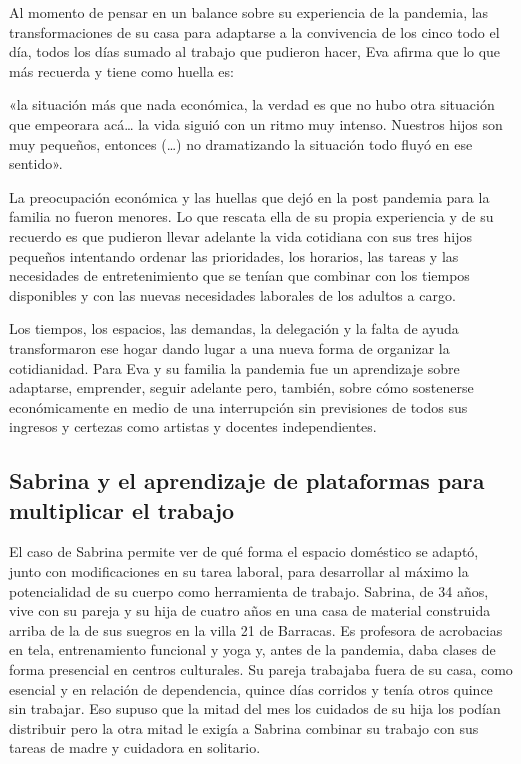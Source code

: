 \begin{refsection}
Al momento de pensar en un balance sobre su experiencia de la pandemia, las transformaciones de su casa para adaptarse a la convivencia de los cinco todo el día, todos los días sumado al trabajo que pudieron hacer, Eva afirma que lo que más recuerda y tiene como huella es:


\begin{gbcita}
«la situación más que nada económica, la verdad es que no hubo otra situación que empeorara acá… la vida siguió con un ritmo muy intenso. Nuestros hijos son muy pequeños, entonces (…) no dramatizando la situación todo fluyó en ese sentido».

\end{gbcita}

La preocupación económica y las huellas que dejó en la post pandemia para la familia no fueron menores. Lo que rescata ella de su propia experiencia y de su recuerdo es que pudieron llevar adelante la vida cotidiana con sus tres hijos pequeños intentando ordenar las prioridades, los horarios, las tareas y las necesidades de entretenimiento que se tenían que combinar con los tiempos disponibles y con las nuevas necesidades laborales de los adultos a cargo.

Los tiempos, los espacios, las demandas, la delegación y la falta de ayuda transformaron ese hogar dando lugar a una nueva forma de organizar la cotidianidad. Para Eva y su familia la pandemia fue un aprendizaje sobre adaptarse, emprender, seguir adelante pero, también, sobre cómo sostenerse económicamente en medio de una interrupción sin previsiones de todos sus ingresos y certezas como artistas y docentes independientes.


\subsection[Sabrina y el aprendizaje de plataformas para multiplicar el trabajo]{Sabrina y el aprendizaje de plataformas para multiplicar el trabajo}
\label{cap-28.sabrina-y-el-aprendizaje-de-plataformas-para-multiplicar-el-trabajo}
El caso de Sabrina permite ver de qué forma el espacio doméstico se adaptó, junto con modificaciones en su tarea laboral, para desarrollar al máximo la potencialidad de su cuerpo como herramienta de trabajo. Sabrina, de 34 años, vive con su pareja y su hija de cuatro años en una casa de material construida arriba de la de sus suegros en la villa 21 de Barracas. Es profesora de acrobacias en tela, entrenamiento funcional y yoga y, antes de la pandemia, daba clases de forma presencial en centros culturales. Su pareja trabajaba fuera de su casa, como esencial y en relación de dependencia, quince días corridos y tenía otros quince sin trabajar. Eso supuso que la mitad del mes los cuidados de su hija los podían distribuir pero la otra mitad le exigía a Sabrina combinar su trabajo con sus tareas de madre y cuidadora en solitario.


\end{refsection}
